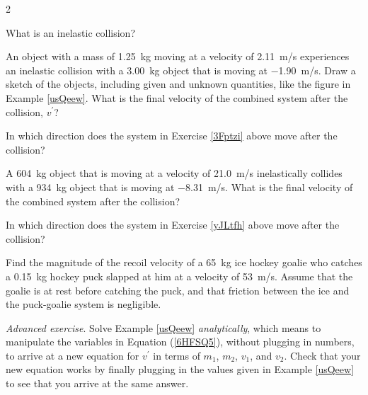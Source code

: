 \documentclass{article}
\numberwithin{equation}{section}
\numberwithin{figure}{section}
\begin{document}
\begin{multicols*}{2}

\begin{exercise} \label{Hjk6xk}
    What is an inelastic collision?
\end{exercise}

\begin{exercise} \label{3Fptzi}
    An object with a mass of \SI{1.25}{kg} moving at a velocity of \SI{2.11}{m/s} experiences an inelastic collision with a \SI{3.00}{kg} object that is moving at \SI{-1.90}{m/s}. Draw a sketch of the objects, including given and unknown quantities, like the figure in Example \ref{usQeew}. What is the final velocity of the combined system after the collision, $v^{\prime}$? 
\end{exercise}

\begin{exercise} \label{17GLnY}
    In which direction does the system in Exercise \ref{3Fptzi} above move after the collision?
\end{exercise}

\begin{exercise} \label{yJLtfh}
        A \SI{604}{kg} object that is moving at a velocity of \SI{21.0}{m/s} inelastically collides with a \SI{934}{kg} object that is moving at \SI{-8.31}{m/s}. What is the final velocity of the combined system after the collision?
\end{exercise}

\begin{exercise} \label{ViY0SX}
    In which direction does the system in Exercise \ref{yJLtfh} above move after the collision?
\end{exercise}



\begin{exercise} \label{jA5zHj}
Find the magnitude of the recoil velocity of a \SI{65}{kg} ice hockey goalie who catches a \SI{0.15}{kg} hockey puck slapped at him at a velocity of \SI{53}{m/s}. Assume that the goalie is at rest before catching the puck, and that friction between the ice and the puck-goalie system is negligible.
\end{exercise}

\begin{exercise} \label{}
\textit{Advanced exercise}. Solve Example \ref{usQeew} \textit{analytically}, which means to manipulate the variables in Equation (\ref{6HFSQ5}), without plugging in numbers, to arrive at a new equation for $v^{\prime}$ in terms of $m_1$, $m_2$, $v_1$, and $v_2$. Check that your new equation works by finally plugging in the values given in Example \ref{usQeew} to see that you arrive at the same answer.
\end{exercise}
\end{multicols*}
\end{document}
